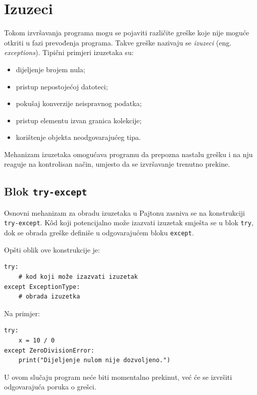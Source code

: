 \section{Izuzeci}

Tokom izvršavanja programa mogu se pojaviti različite greške koje nije moguće otkriti u fazi prevođenja programa. Takve greške nazivaju se \textit{izuzeci} (eng. \textit{exceptions}). Tipični primjeri izuzetaka su:

\begin{itemize}
	\item dijeljenje brojem nula;
	\item pristup nepostojećoj datoteci;
	\item pokušaj konverzije neispravnog podatka;
	\item pristup elementu izvan granica kolekcije;
	\item korištenje objekta neodgovarajućeg tipa.
\end{itemize}

Mehanizam izuzetaka omogućava programu da prepozna nastalu grešku i na nju reaguje na kontrolisan način, umjesto da se izvršavanje trenutno prekine.

\subsection{Blok \texttt{try-except}}

Osnovni mehanizam za obradu izuzetaka u Pajtonu zasniva se na konstrukciji \texttt{try-except}. K\^od koji potencijalno može izazvati izuzetak smješta se u blok \texttt{try}, dok se obrada greške definiše u odgovarajućem bloku \texttt{except}.

Opšti oblik ove konstrukcije je:

\begin{verbatim}
try:
    # kod koji može izazvati izuzetak
except ExceptionType:
    # obrada izuzetka
\end{verbatim}

Na primjer:

\begin{verbatim}
try:
    x = 10 / 0
except ZeroDivisionError:
    print("Dijeljenje nulom nije dozvoljeno.")
\end{verbatim}

U ovom slučaju program neće biti momentalno prekinut, već će se izvršiti odgovarajuća poruka o grešci.


